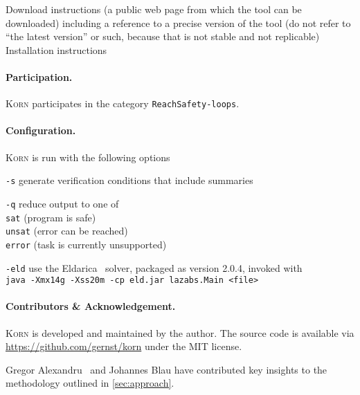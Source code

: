 \documentclass{llncs}
\newcommand{\Korn}{\textsc{Korn}\xspace}
\begin{document}
    Download instructions (a public web page from which the tool can be downloaded) including a reference to a precise version of the tool (do not refer to ``the latest version'' or such, because that is not stable and not replicable)
    Installation instructions

\paragraph{Participation.} \Korn participates in the category \texttt{ReachSafety-loops}.

\paragraph{Configuration.} \Korn is run with the following options

\medskip

\texttt{-s}
    \tabto{2cm} generate verification conditions that include summaries

\medskip

\texttt{-q}
    \tabto{2cm} reduce output to one of \\
    \tabto{2cm} \texttt{sat}   \tabto{3cm} (program is safe) \\
    \tabto{2cm} \texttt{unsat} \tabto{3cm} (error can be reached) \\
    \tabto{2cm} \texttt{error} \tabto{3cm} (task is currently unsupported)

\medskip

\texttt{-eld}
    \tabto{2cm} use the Eldarica~\cite{hojjat2018eldarica} solver, packaged as version 2.0.4, invoked with \\
    \tabto{2cm} \texttt{java -Xmx14g -Xss20m -cp eld.jar lazabs.Main <file>}
    

    
\paragraph{Contributors \& Acknowledgement.}

\Korn is developed and maintained by the author.
The source code is available via \url{https://github.com/gernst/korn} under the MIT license.

Gregor Alexandru~\cite{alexandru2019} and Johannes Blau have contributed
key insights to the methodology outlined in \cref{sec:approach}.



\end{document}

